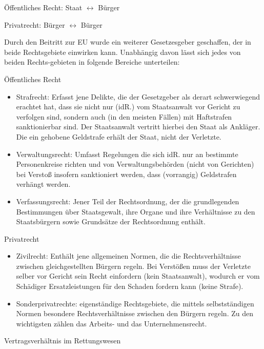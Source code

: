 \documentclass{article}
\begin{document}
\"Offentliches Recht: Staat ${\leftrightarrow}$ B\"urger

Privatrecht: B\"urger ${\leftrightarrow}$ B\"urger

Durch den Beitritt zur EU wurde ein weiterer Gesetzesgeber geschaffen,
der in beide Rechtsgebiete einwirken kann. Unabh\"angig davon l\"asst
sich jedes von beiden Rechts-gebieten in folgende Bereiche unterteilen:

\"Offentliches Recht

\begin{itemize}
\item Strafrecht: Erfasst jene Delikte, die der Gesetzgeber als derart
schwerwiegend erachtet hat, dass sie nicht nur (idR.) vom Staatsanwalt
vor Gericht zu verfolgen sind,  sondern auch (in den meisten F\"allen)
mit Haftstrafen sanktionierbar sind. Der Staatsanwalt vertritt hierbei
den Staat als Ankl\"ager. Die ein gehobene Geldstrafe erh\"alt der
Staat, nicht der Verletzte.

\item Verwaltungsrecht: Umfasst Regelungen die sich idR. nur an
bestimmte Personenkreise richten und von Verwaltungsbeh\"orden (nicht
von Gerichten) bei Versto{\ss} insofern sanktioniert werden, dass
(vorrangig) Geldstrafen verh\"angt werden.

\item Verfassungsrecht: Jener Teil der Rechtsordnung, der die
grundlegenden Bestimmungen \"uber Staatsgewalt, ihre Organe und ihre
Verh\"altnisse zu den Staatsb\"urgern sowie Grunds\"atze der
Rechtsordnung enth\"alt.

\end{itemize}
Privatrecht

\begin{itemize}
\item Zivilrecht: Enth\"alt jene allgemeinen Normen, die die
Rechtsverh\"altnisse zwischen gleichgestellten B\"urgern regeln. Bei
Verst\"o{\ss}en muss der Verletzte selber vor Gericht sein Recht
einfordern (kein Staatsanwalt), wodurch er vom Sch\"adiger
Ersatzleistungen f\"ur den Schaden fordern kann (keine Strafe).

\item Sonderprivatrechte: eigenst\"andige Rechtsgebiete, die mittels
selbstst\"andigen Normen besondere Rechtsverh\"altnisse zwischen den
B\"urgern regeln. Zu den wichtigsten z\"ahlen das Arbeits- und das
Unternehmensrecht.

\end{itemize}
Vertragsverh\"altnis im Rettungswesen
\end{document}
